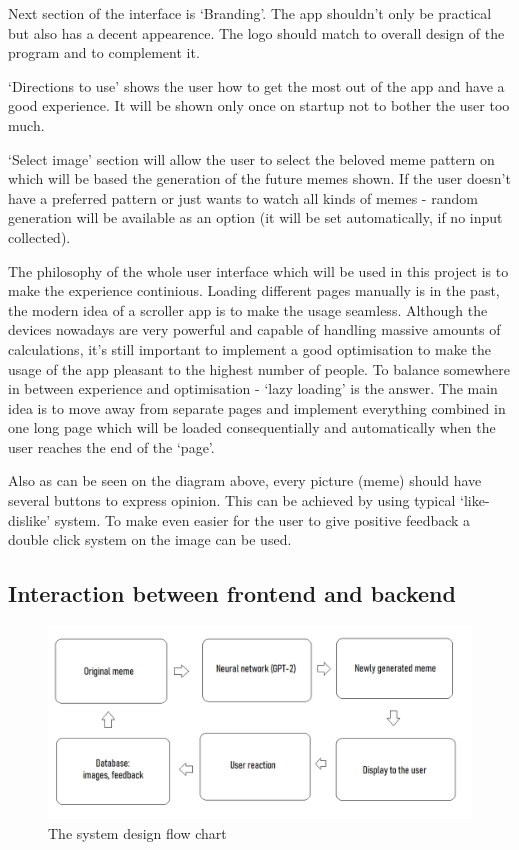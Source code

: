 \documentclass[12pt]{report}
\begin{document}
    Next section of the interface is `Branding'. The app shouldn't only be practical but also has a decent appearence. The logo should match to overall design of the program and to complement it.

    `Directions to use' shows the user how to get the most out of the app and have a good experience. It will be shown only once on startup not to bother the user too much.

    `Select image' section will allow the user to select the beloved meme pattern on which will be based the generation of the future memes shown. If the user doesn't have a preferred pattern or just wants to watch all kinds of memes - random generation will be available as an option (it will be set automatically, if no input collected).

    The philosophy of the whole user interface which will be used in this project is to make the experience continious. Loading different pages manually is in the past, the modern idea of a scroller app is to make the usage seamless. Although the devices nowadays are very powerful and capable of handling massive amounts of calculations, it's still
    important to implement a good optimisation to make the usage of the app pleasant to the highest number of people. To balance somewhere in between experience and optimisation - `lazy loading' is the answer. The main idea is to move away from separate pages and implement everything combined in one long page which will be loaded consequentially and automatically when the user reaches the end of the `page'.

    Also as can be seen on the diagram above, every picture (meme) should have several buttons to express opinion. This can be achieved by using typical `like-dislike' system. To make even easier for the user to give positive feedback a double click system on the image can be used.
    

    \subsection*{Interaction between frontend and backend}

    \begin{figure}[h]
        \centerline{\includegraphics[scale=.5]{img/flow_diagram.png}}
        \label{flow_diagram}
        \caption{The system design flow chart}
    \end{figure}
\end{document}
